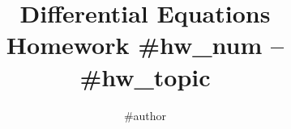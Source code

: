 \documentclass[fleqn]{article}
\title{
	Differential Equations \\
	\medskip
	\large Homework #{hw_num} -- #{hw_topic}
}
\author{#{author}}
\begin{document}
\maketitle

\begin{answers}

    \item

\end{answers}
\end{document}
